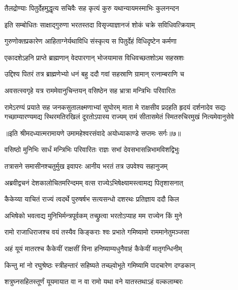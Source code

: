 \twolineshloka
{तैलद्रोण्याः पितुर्देहमुद्धृत्य सचिवैः सह}
{कृत्यं कुरु यथान्यायमस्माभिः कुलनन्दन} %

\twolineshloka
{इति सम्बोधितः साक्षाद्गुरुणा भरतस्तदा}
{विसृज्याज्ञानजं शोकं चक्रे सविधिवत्क्रियाम्} %

\twolineshloka
{गुरुणोक्तप्रकारेण आहिताग्नेर्यथाविधि}
{संस्कृत्य स पितुर्देहं विधिदृष्टेन कर्मणा} %

\twolineshloka
{एकादशेऽहनि प्राप्ते ब्राह्मणान् वेदपारगान्}
{भोजयामास विधिवच्छतशोऽथ सहस्रशः} %

\twolineshloka
{उद्दिश्य पितरं तत्र ब्राह्मणेभ्यो धनं बहु}
{ददौ गवां सहस्राणि ग्रामान् रत्नाम्बराणि च} %

\twolineshloka
{अवसत्स्वगृहे यत्र राममेवानुचिन्तयन्}
{वसिष्ठेन सह भ्रात्रा मन्त्रिभिः परिवारितः} %

\fourlineindentedshloka
{रामेऽरण्यं प्रयाते सह जनकसुतालक्ष्मणाभ्यां सुघोरम्}
{माता मे राक्षसीव प्रदहति हृदयं दर्शनादेव सद्यः}
{गच्छाम्यारण्यमद्य स्थिरमतिरखिलं दूरतोऽपास्य राज्यम्}
{रामं सीतासमेतं स्मितरुचिरमुखं नित्यमेवानुसेवे} %

{॥इति श्रीमदध्यात्मरामायणे उमामहेश्वरसंवादे
अयोध्याकाण्डे सप्तमः सर्गः॥७॥
}




\twolineshloka
{वसिष्ठो मुनिभिः सार्धं मन्त्रिभिः परिवारितः}
{राज्ञः सभां देवसभासन्निभामविशद्विभुः} %

\twolineshloka
{तत्रासने समासीनश्चतुर्मुख इवापरः}
{आनीय भरतं तत्र उपवेश्य सहानुजम्} %

\twolineshloka
{अब्रवीद्वचनं देशकालोचितमरिन्दमम्}
{वत्स राज्येऽभिषेक्ष्यामस्त्वामद्य पितृशासनात्} %

\twolineshloka
{कैकेय्या याचितं राज्यं त्वदर्थे पुरुषर्षभ}
{सत्यसन्धो दशरथः प्रतिज्ञाय ददौ किल} %

\twolineshloka
{अभिषेको भवत्वद्य मुनिभिर्मन्त्रपूर्वकम्}
{तच्छ्रुत्वा भरतोऽप्याह मम राज्येन किं मुने} %

\twolineshloka
{रामो राजाधिराजश्च वयं तस्यैव किङ्कराः}
{श्वः प्रभाते गमिष्यामो राममानेतुमञ्जसा} %

\twolineshloka
{अहं यूयं मातरश्च कैकेयीं राक्षसीं विना}
{हनिष्याम्यधुनैवाहं कैकेयीं मातृगन्धिनीम्} %

\twolineshloka
{किन्तु मां नो रघुश्रेष्ठः स्त्रीहन्तारं सहिष्यते}
{तच्छ्वोभूते गमिष्यामि पादचारेण दण्डकान्} %

\twolineshloka
{शत्रुघ्नसहितस्तूर्णं यूयमायात वा न वा}
{रामो यथा वने यातस्तथाऽहं वल्कलाम्बरः} %

